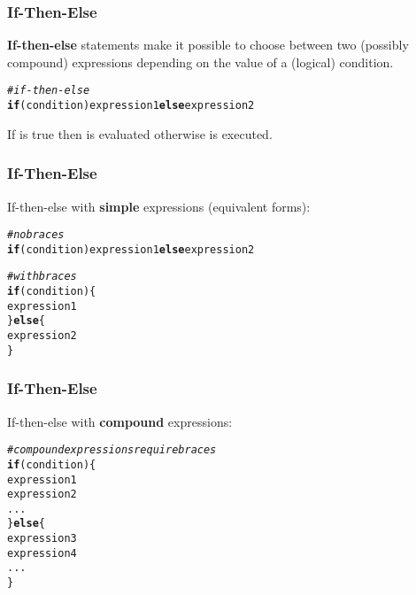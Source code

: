 \documentclass[12pt]{beamer}\usepackage[]{graphicx}\usepackage[]{color}
\makeatletter
\newcommand{\hlcom}[1]{\textcolor[rgb]{0.678,0.584,0.686}{\textit{#1}}}%
\newcommand{\hlstd}[1]{\textcolor[rgb]{0.345,0.345,0.345}{#1}}%
\newcommand{\hlkwa}[1]{\textcolor[rgb]{0.161,0.373,0.58}{\textbf{#1}}}%
\newenvironment{kframe}{%
 \def\at@end@of@kframe{}%
 \ifinner\ifhmode%
  \def\at@end@of@kframe{\end{minipage}}%
  \begin{minipage}{\columnwidth}%
 \fi\fi%
 \def\FrameCommand##1{\hskip\@totalleftmargin \hskip-\fboxsep
 \colorbox{shadecolor}{##1}\hskip-\fboxsep
     \hskip-\linewidth \hskip-\@totalleftmargin \hskip\columnwidth}%
 \MakeFramed {\advance\hsize-\width
   \@totalleftmargin\z@ \linewidth\hsize
   \@setminipage}}%
 {\par\unskip\endMakeFramed%
 \at@end@of@kframe}
\newenvironment{knitrout}{}{} %
\makeatother
\begin{document}
\begin{frame}[fragile]
\frametitle{If-Then-Else}

\textbf{If-then-else} statements make it possible to choose between two (possibly compound) expressions depending on the value of a (logical) condition.

\begin{knitrout}\footnotesize
{}\color{fgcolor}\begin{kframe}
\begin{alltt}
\hlcom{# if-then-else}
\hlkwa{if} \hlstd{(condition) expression1} \hlkwa{else} \hlstd{expression2}
\end{alltt}
\end{kframe}
\end{knitrout}
If  is true then  is evaluated otherwise  is executed.

\end{frame}


\begin{frame}[fragile]
\frametitle{If-Then-Else}

If-then-else with \textbf{simple} expressions (equivalent forms):

\begin{knitrout}\footnotesize
{}\color{fgcolor}\begin{kframe}
\begin{alltt}
\hlcom{# no braces}
\hlkwa{if} \hlstd{(condition) expression1} \hlkwa{else} \hlstd{expression2}


\hlcom{# with braces}
\hlkwa{if} \hlstd{(condition) \{}
  \hlstd{expression1}
\hlstd{\}} \hlkwa{else} \hlstd{\{}
  \hlstd{expression2}
\hlstd{\}}
\end{alltt}
\end{kframe}
\end{knitrout}

\end{frame}


\begin{frame}[fragile]
\frametitle{If-Then-Else}

If-then-else with \textbf{compound} expressions:

\begin{knitrout}\footnotesize
{}\color{fgcolor}\begin{kframe}
\begin{alltt}
\hlcom{# compound expressions require braces}
\hlkwa{if} \hlstd{(condition) \{}
  \hlstd{expression1}
  \hlstd{expression2}
  \hlstd{...}
\hlstd{\}} \hlkwa{else} \hlstd{\{}
  \hlstd{expression3}
  \hlstd{expression4}
  \hlstd{...}
\hlstd{\}}
\end{alltt}
\end{kframe}
\end{knitrout}

\end{frame}
\end{document}
